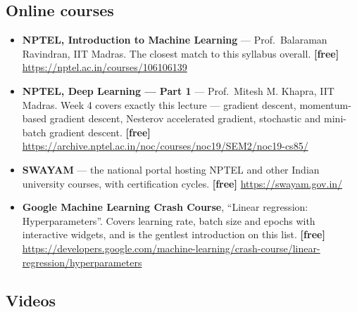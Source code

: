 \documentclass[11pt]{article}
\begin{document}
\subsection*{Online courses}

\begin{sloppypar}
\begin{itemize}[leftmargin=*]
  \item \textbf{NPTEL, Introduction to Machine Learning} --- Prof.\ Balaraman
    Ravindran, IIT Madras. The closest match to this syllabus overall.
    \textbf{[free]} \url{https://nptel.ac.in/courses/106106139}
  \item \textbf{NPTEL, Deep Learning --- Part 1} --- Prof.\ Mitesh M. Khapra,
    IIT Madras. Week 4 covers exactly this lecture --- gradient descent,
    momentum-based gradient descent, Nesterov accelerated gradient, stochastic
    and mini-batch gradient descent. \textbf{[free]}
    \url{https://archive.nptel.ac.in/noc/courses/noc19/SEM2/noc19-cs85/}
  \item \textbf{SWAYAM} --- the national portal hosting NPTEL and other Indian
    university courses, with certification cycles.
    \textbf{[free]} \url{https://swayam.gov.in/}
  \item \textbf{Google Machine Learning Crash Course}, ``Linear regression:
    Hyperparameters''. Covers learning rate, batch size and epochs with
    interactive widgets, and is the gentlest introduction on this list.
    \textbf{[free]}
    \url{https://developers.google.com/machine-learning/crash-course/linear-regression/hyperparameters}
\end{itemize}
\end{sloppypar}

\subsection*{Videos}
\end{document}
